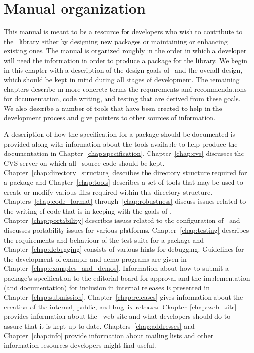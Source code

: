 \section{Manual organization}
\label{sec:manual_org}

This manual is meant to be a resource for developers who wish to contribute
to the \cgal\ library either by designing new packages or maintaining
or enhancing existing ones. The manual is organized roughly in the order in
which a developer will need the information in order to produce a package
for the library. We begin in this chapter with a description 
of the design goals of \cgal\ and the overall design, which should be kept 
in mind during all stages of development.  The remaining chapters describe 
in more concrete terms the requirements and recommendations for documentation, 
code writing, and testing that are derived from these goals.  We also describe 
a number of tools that have been created to help in the development process 
and give pointers to other sources of information.

A description of how the specification 
for a package should be documented is provided along with information about
the tools available to help produce the documentation  
in Chapter~\ref{chap:specification}.
Chapter~\ref{chap:cvs} discusses the CVS server on which all \cgal\ source
code should be kept.
Chapter~\ref{chap:directory_structure} describes the directory structure 
required for a package and Chapter~\ref{chap:tools} describes a set of tools 
that may be used to create or modify various files required within this 
directory structure. Chapters~\ref{chap:code_format} 
through~\ref{chap:robustness}
discuss issues related to the writing of code that is in keeping with
the goals of \cgal.  Chapter~\ref{chap:portability} describes issues
related to the configuration of \cgal\ and 
discusses portability issues for various platforms. Chapter~\ref{chap:testing} 
describes the requirements and behaviour of the test suite for a package and 
Chapter~\ref{chap:debugging} consists of various hints for debugging.
Guidelines for the development of example and demo programs are given in
Chapter~\ref{chap:examples_and_demos}. Information 
about how to submit a package's specification to the editorial board 
for approval and the implementation (and documentation) for inclusion in 
internal releases is presented in  Chapter~\ref{chap:submission}.
Chapter~\ref{chap:releases} gives information about the creation of the
internal, public, and bug-fix releases.  Chapter~\ref{chap:web_site}
provides information about the \cgal\ web site and what developers should
do to assure that it is kept up to date.
Chapters~\ref{chap:addresses} and Chapter~\ref{chap:info} 
provide information about mailing lists and other information 
resources developers might find useful.
